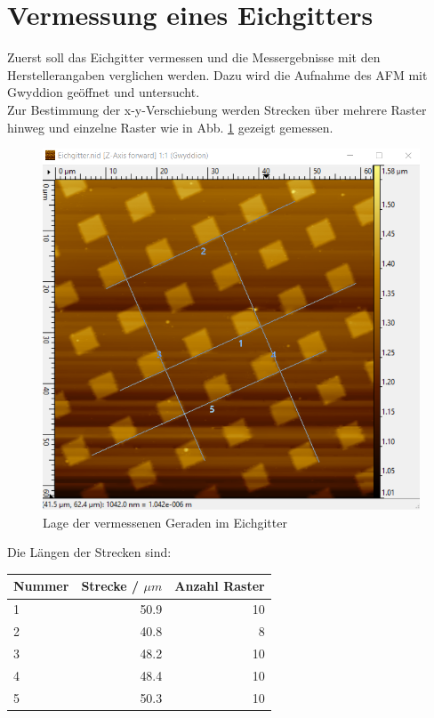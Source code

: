 

\section{Vermessung eines Eichgitters}
Zuerst soll das Eichgitter vermessen und die Messergebnisse mit den Herstellerangaben verglichen werden. Dazu wird die Aufnahme des AFM mit 
Gwyddion geöffnet und untersucht.\\
Zur Bestimmung der x-y-Verschiebung werden Strecken über mehrere Raster hinweg und einzelne Raster wie in Abb. \ref{bild:EichWo} gezeigt 
gemessen. 

\begin{figure}[h]
    \centering
    \includegraphics[scale = 0.5]{Bilder/EichGeraden.png}
    \caption{Lage der vermessenen Geraden im Eichgitter}
    \label{bild:EichWo}
\end{figure}

Die Längen der Strecken sind:

\begin{center}
    \centering
    \begin{tabular}{l|r r}
        Nummer & Strecke / $\mu m$ & Anzahl Raster \\
        \hline
        1 & 50.9 & 10\\
        2 & 40.8 & 8\\
        3 & 48.2 & 10 \\
        4 & 48.4 & 10 \\
        5 & 50.3 & 10\\
        
    \end{tabular}
\end{center}

